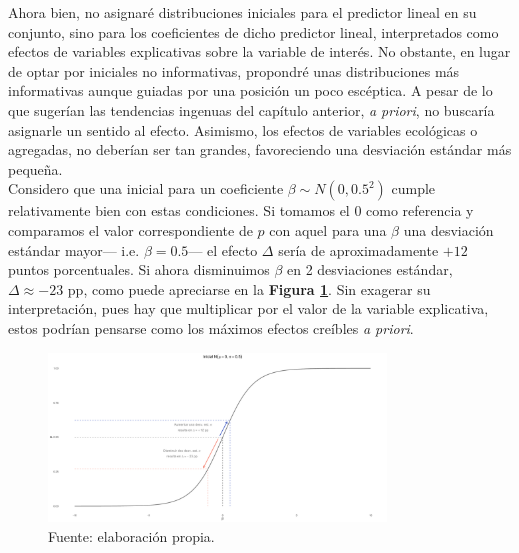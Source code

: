 Ahora bien, no asignaré distribuciones iniciales para el predictor lineal en su conjunto, sino para los coeficientes de dicho predictor lineal, interpretados como efectos de variables explicativas sobre la variable de interés. No obstante, en lugar de optar por iniciales no informativas, propondré unas distribuciones más informativas aunque guiadas por una posición un poco escéptica. A pesar de lo que sugerían las tendencias ingenuas del capítulo anterior, \textit{a priori}, no buscaría asignarle un sentido al efecto. Asimismo, los efectos de variables ecológicas o agregadas, no deberían ser tan grandes, favoreciendo una desviación estándar más pequeña.\\ 

Considero que una inicial para un coeficiente $\beta\sim N(0,0.5^2)$ cumple relativamente bien con estas condiciones. Si tomamos el $0$ como referencia y comparamos el valor correspondiente de $p$ con aquel para una $\beta$ una desviación estándar mayor--- i.e. $\beta = 0.5$--- el efecto $\Delta$ sería de aproximadamente $+12$ puntos porcentuales. Si ahora disminuimos $\beta$ en 2 desviaciones estándar,  $\Delta \approx -23$ pp, como puede apreciarse en la \textbf{Figura \ref{fig:Inicial_Coef}}. Sin exagerar su interpretación, pues hay que multiplicar por el valor de la variable explicativa, estos podrían pensarse como los máximos efectos creíbles \textit{a priori}.\\ 

\begin{figure}[h]
	\centering
	\includegraphics[width = 0.8\textwidth]{Figs/Modelado/Inicial_N0_un_medio}
	\caption{Fuente: elaboración propia.}
	\label{fig:Inicial_Coef}
\end{figure}

